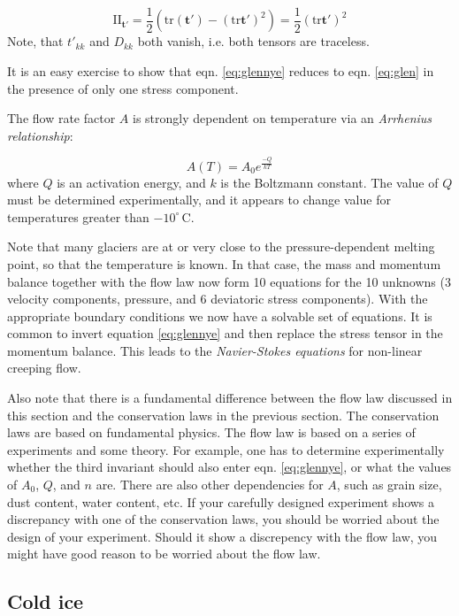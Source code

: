 \documentclass[12pt, openany]{memoir}
\newcommand{\cels}[1]{\ensuremath{#1^{\circ}\,\mathrm{C}}}
\begin{document}
\begin{equation}
\mathrm{II}_\mathbf{t'} = \frac{1}{2} \left( \mathrm{tr}( \mathbf{t'})
- (\mathrm{tr}\mathbf{t'})^2 \right) = \frac{1}{2}
(\mathrm{tr}\mathbf{t'})^2 
\end{equation}
Note, that $t'_{kk}$ and $D_{kk}$ both vanish, i.e. both tensors are
traceless. 

It is an easy exercise to show that eqn. \ref{eq:glennye} reduces to
eqn. \ref{eq:glen} in the presence of only one stress component. 

The flow rate factor $A$ is strongly dependent on temperature via an
\emph{Arrhenius relationship}:

\begin{equation}
A(T) = A_0 e^\frac{-Q}{kT}
\end{equation}
where $Q$ is an activation energy, and $k$ is the Boltzmann
constant. The value of $Q$ must be determined experimentally, and it
appears to change value for temperatures greater than \cels{-10}.

Note that many glaciers are at or very close to the pressure-dependent
melting point, so that the temperature is known. In that case, the
mass and momentum balance together with the flow law now form 10
equations for the 10 unknowns (3 velocity components, pressure, and 6
deviatoric stress components). With the appropriate boundary
conditions we now have a solvable set of equations. It is common to
invert equation \ref{eq:glennye} and then replace the stress tensor in
the momentum balance. This leads to the \emph{Navier-Stokes equations}
for non-linear creeping flow.

Also note that there is a fundamental difference between the flow law
discussed in this section and the conservation laws in the previous
section. The conservation laws are based on fundamental physics. The
flow law is based on a series of experiments and some theory. For
example, one has to determine experimentally whether the third
invariant should also enter eqn. \ref{eq:glennye}, or what the values
of $A_0$, $Q$, and $n$ are. There are also other dependencies for $A$,
such as grain size, dust content, water content, etc. If your
carefully designed experiment shows a discrepancy with one of the
conservation laws, you should be worried about the design of your
experiment. Should it show a discrepency with the flow law, you might
have good reason to be worried about the flow law. 

\subsection{Cold ice}
\end{document}
